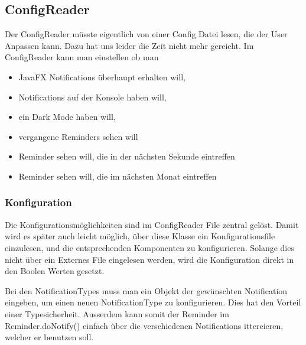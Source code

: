 \subsection{ConfigReader}
Der ConfigReader müsste eigentlich von einer Config Datei lesen, die der User Anpassen kann. Dazu hat uns leider die Zeit nicht mehr gereicht.
Im ConfigReader kann man einstellen ob man
\begin{itemize}
  \item JavaFX Notifications überhaupt erhalten will,
  \item Notifications auf der Konsole haben will,
  \item ein Dark Mode haben will,
  \item vergangene Reminders sehen will
  \item Reminder sehen will, die in der nächsten Sekunde eintreffen
  \item Reminder sehen will, die im nächsten Monat eintreffen
\end{itemize}

\subsubsection{Konfiguration}
Die Konfigurationsmöglichkeiten sind im ConfigReader File zentral gelöst. Damit wird es später auch leicht möglich, über diese Klasse ein Konfigurationsfile  einzulesen, und die entsprechenden Komponenten zu konfigurieren. Solange dies nicht  über ein Externes File eingelesen werden, wird die Konfiguration direkt in den Boolen Werten gesetzt.

Bei den NotificationTypes muss man ein Objekt der gewünschten Notification eingeben, um einen neuen NotificationType  zu konfigurieren. Dies hat den Vorteil einer Typesicherheit. Ausserdem kann somit der Reminder im Reminder.doNotify() einfach über die verschiedenen Notifications ittereieren, welcher er benutzen soll.
